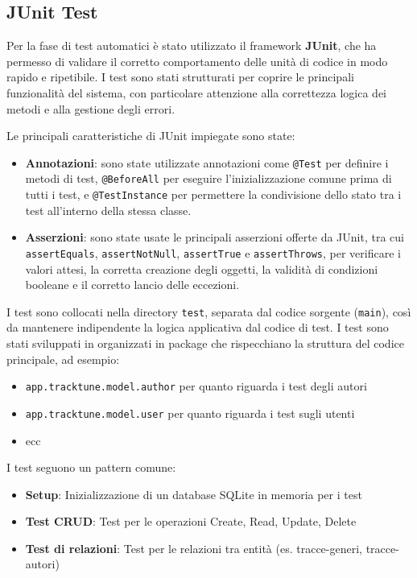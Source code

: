\documentclass[a4paper]{article}
\begin{document}
\subsection{JUnit Test}
Per la fase di test automatici è stato utilizzato il framework \textbf{JUnit}, che ha permesso di validare il corretto comportamento delle unità di codice in modo rapido e ripetibile. I test sono stati strutturati per coprire le principali funzionalità del sistema, con particolare attenzione alla correttezza logica dei metodi e alla gestione degli errori.

Le principali caratteristiche di JUnit impiegate sono state:

\begin{itemize}
    \item \textbf{Annotazioni}: sono state utilizzate annotazioni come \texttt{@Test} per definire i metodi di test, \texttt{@BeforeAll} per eseguire l'inizializzazione comune prima di tutti i test, e \texttt{@TestInstance} per permettere la condivisione dello stato tra i test all'interno della stessa classe.

    \item \textbf{Asserzioni}: sono state usate le principali asserzioni offerte da JUnit, tra cui \texttt{assertEquals}, \texttt{assertNotNull}, \texttt{assertTrue} e \texttt{assertThrows}, per verificare i valori attesi, la corretta creazione degli oggetti, la validità di condizioni booleane e il corretto lancio delle eccezioni.
\end{itemize}

\bigskip

I test sono collocati nella directory \texttt{test}, separata dal codice sorgente (\texttt{main}), così da mantenere indipendente la logica applicativa dal codice di test.
I test sono stati sviluppati in organizzati in package che rispecchiano la struttura del codice principale, ad esempio:
\begin{itemize}
    \item \texttt{app.tracktune.model.author} per quanto riguarda i test degli autori
    \item \texttt{app.tracktune.model.user} per quanto riguarda i test sugli utenti
    \item ecc
\end{itemize}

I test seguono un pattern comune:
\begin{itemize}
    \item \textbf{Setup}: Inizializzazione di un database SQLite in memoria per i test
    \item \textbf{Test CRUD}: Test per le operazioni Create, Read, Update, Delete
    \item \textbf{Test di relazioni}: Test per le relazioni tra entità (es. tracce-generi, tracce-autori)
\end{itemize}
\end{document}
